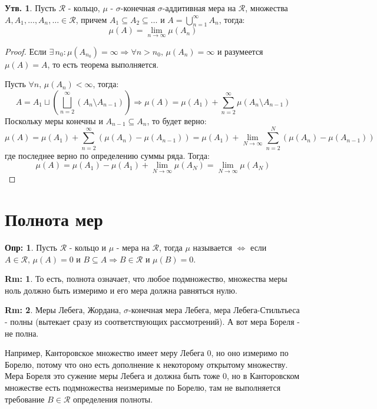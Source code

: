 \documentclass[12pt]{article}
\newcommand{\MCR}{\mathcal{R}}
\theoremstyle{definition}
\newtheorem{defn}{Опр:}
\newtheorem{rem}{Rm:}
\newtheorem{prop}{Утв.}
\begin{document}
\begin{prop}
	Пусть $\MCR$ - кольцо, $\mu$ - $\sigma$-конечная $\sigma$-аддитивная  мера на $\MCR$, множества $A, A_1, \dotsc, A_n, \dotsc \in \MCR$, причем $A_1 \subseteq A_2 \subseteq \dotsc $ и $A = \bigcup\limits_{n = 1}^{\infty} A_n$, тогда: 
	$$
		\mu(A) = \lim\limits_{n \to \infty} \mu(A_n)
	$$
\end{prop}
\begin{proof}
	Если $\exists \, n_0 \colon \mu(A_{n_0}) = \infty \Rightarrow \forall n > n_0, \, \mu(A_n) = \infty$ и разумеется $\mu(A) = A$, то есть теорема выполняется.
	
	Пусть $\forall n, \, \mu(A_n) < \infty$, тогда:
	$$
		A = A_1 \sqcup \left(\bigsqcup\limits_{n = 2}^{\infty} \left(A_n \setminus A_{n - 1}\right) \right) \Rightarrow \mu(A) = \mu(A_1) + \sum\limits_{n = 2}^{\infty} \mu(A_n \setminus A_{n-1})
	$$
	Поскольку меры конечны и $A_{n-1} \subseteq A_n$, то будет верно:
	$$
		\mu(A) = \mu(A_1) + \sum\limits_{n = 2}^{\infty}\left(\mu(A_n) - \mu(A_{n-1})\right) = \mu(A_1) + \lim\limits_{N \to \infty} \sum\limits_{n = 2}^N \left(\mu(A_n) - \mu(A_{n-1})\right)
	$$
	где последнее верно по определению суммы ряда. Тогда:
	$$
		\mu(A) = \mu(A_1) - \mu(A_1) + \lim\limits_{N \to \infty}\mu(A_N) = \lim\limits_{N \to \infty}\mu(A_N)
	$$
\end{proof}

\section*{Полнота мер}
\begin{defn}
	Пусть $\MCR$ - кольцо и $\mu$ - мера на $\MCR$, тогда $\mu$ называется  $\Leftrightarrow$ если $A \in \MCR,\, \mu(A) = 0$ и $B \subseteq A \Rightarrow B \in \MCR$ и $\mu(B) = 0$.
\end{defn}
\begin{rem}
	То есть, полнота означает, что любое подмножество, множества меры ноль должно быть измеримо и его мера должна равняться нулю.
\end{rem}
\begin{rem}
	Меры Лебега, Жордана, $\sigma$-конечная мера Лебега, мера Лебега-Стильтьеса - полны (вытекает сразу из соответствующих рассмотрений). А вот мера Бореля - не полна. 
	
	 Например, Канторовское множество имеет меру Лебега $0$, но оно измеримо по Борелю, потому что оно есть дополнение к некоторому открытому множеству. Мера Бореля это сужение меры Лебега и должна быть тоже $0$, но в Канторовском множестве есть подмножества неизмеримые по Борелю, там не выполняется требование $B \in \MCR$ определения полноты. 
\end{rem}
\end{document}
